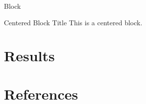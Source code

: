 \documentclass[UTF8]{ctexbeamer}
\begin{document}
\begin{frame}{Block}
  \begin{block}{\centering Centered Block Title}
    This is a centered block.
  \end{block}
\end{frame}

\section{Results}


\section{References}

\begin{frame}[allowframebreaks]
    
    
    \nocite{*} %
\end{frame}
\end{document}
